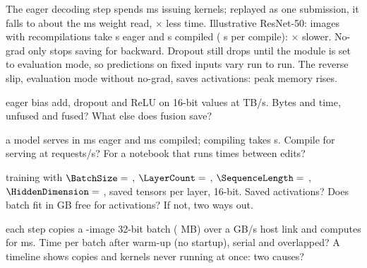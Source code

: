 \documentclass{studysheet}
\begin{document}
\begin{rightcol}
%
  {The eager decoding step spends  ms issuing kernels; replayed as one submission, it
   falls to about the  ms weight read, $\times$ less time.}{}
%
  {Illustrative ResNet-50:  images with  recompilations take
    s eager and  s compiled ( s per compile): $\times$ slower.}{}
%
  {No-grad only stops saving for backward. Dropout still drops until the module is set to evaluation
   mode, so predictions on fixed inputs vary run to run. The reverse slip, evaluation mode
   without no-grad, saves activations: peak memory rises.}{}

\vspace{2pt}
\begin{qs}
\item \assumed{} eager bias add, dropout and ReLU on  16-bit values at  TB/s. Bytes and time,
  unfused and fused? What else does fusion save?
\item \assumed{} a model serves in  ms eager and  ms compiled; compiling takes  s.
  Compile for serving at  requests/s? For a notebook that runs  times between edits?
\item \assumed{} training with $\BatchSize =$ , $\LayerCount =$ , $\SequenceLength =$ ,
  $\HiddenDimension =$ ,  saved tensors per layer, 16-bit. Saved activations? Does batch
   fit in  GB free for activations? If not, two ways out.
\item \assumed{} each step copies a -image 32-bit batch ( MB) over a
   GB/s host link and computes for  ms. Time per batch after warm-up (no startup), serial and
  overlapped? A timeline shows copies and kernels never running at once: two causes?
\end{qs}
\end{rightcol}
\end{document}

